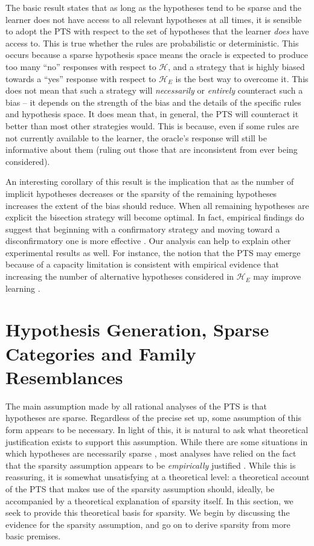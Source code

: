 \documentclass{apa}
\newcommand{\ruleset}{\mathcal{H}}
\begin{document}
The basic result states that as long as the hypotheses tend to be sparse and the learner does not have access to all relevant hypotheses at all times, it is sensible to adopt the PTS with respect to the set of hypotheses that the learner {\it does} have access to. This is true whether the rules are probabilistic or deterministic. This occurs because a sparse hypothesis space means the oracle is expected to produce too many ``no'' responses with respect to $\mathcal{H}$, and a strategy that is highly biased towards a ``yes'' response with respect to  $\mathcal{H}_E$ is the best way to overcome it.  This does not mean that such a strategy will {\it necessarily} or {\it entirely} counteract such a bias -- it depends on the strength of the bias and the details of the specific rules and hypothesis space. It does mean that, in general, the PTS will counteract it better than most other strategies would. This is because, even if some rules are not currently available to the learner, the oracle's response will still be informative about them (ruling out those that are inconsistent from ever being considered).

An interesting corollary of this result is the implication that as the number of implicit hypotheses decreases or the sparsity of the remaining hypotheses increases the extent of the bias should reduce. When all remaining hypotheses are explicit the bisection strategy will become optimal. In fact, empirical findings do suggest that beginning with a confirmatory strategy and moving toward a disconfirmatory one is more effective \cite{mynattetal78}. Our analysis can help to explain other experimental results as well.  For instance, the notion that the PTS may emerge because of a capacity limitation is consistent with empirical evidence that increasing the number of alternative hypotheses considered in $\ruleset_E$ may improve learning \cite{klaymanha89}.



\section{Hypothesis Generation, Sparse Categories and Family Resemblances}

The main assumption made by all rational analyses of the PTS is that hypotheses are sparse. Regardless of the precise set up, some assumption of this form appears to be necessary. In light of this, it is natural to ask what theoretical justification exists to support this assumption. While there are some situations in which hypotheses are necessarily sparse \cite{austerweilgriffiths08}, most analyses have relied on the fact that the sparsity assumption appears to be {\it empirically} justified  \cite{klaymanha87,oaksfordchater94}. While this is reassuring, it is somewhat unsatisfying at a theoretical level: a theoretical account of the PTS that makes use of the sparsity assumption should, ideally, be accompanied by a theoretical explanation of sparsity itself. In this section, we seek to provide this theoretical basis for sparsity. We begin by discussing the evidence for the sparsity assumption, and go on to derive sparsity from more basic premises.
\end{document}

